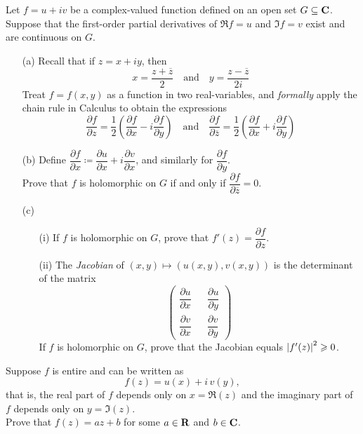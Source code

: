 \begin{problem}\label{prob 8.1}
Let $f = u + iv$ be a complex-valued function defined on an open set $G \subseteq \mathbf C$. Suppose that the first-order partial derivatives of $\Re f = u$ and $\Im f = v$ exist and are continuous on $G$.
\begin{itemize}[itemsep = 1em]
\item[(a)] Recall that if $z = x + iy$, then
\[x = \frac{z + \overline{z}}{2} \quad \text{and} \quad y = \frac{z - \overline{z}}{2i}\]
Treat $f = f(x,y)$ as a function in two real-variables, and \emph{formally} apply the chain rule in Calculus to obtain the expressions
\[\frac{\partial f}{\partial z} = \frac{1}{2}\left(\frac{\partial f}{\partial x} - i\frac{\partial f}{\partial y}\right) \quad \text{and} \quad \frac{\partial f}{\partial \overline{z}} = \frac{1}{2}\left(\frac{\partial f}{\partial x} + i\frac{\partial f}{\partial y}\right)\]
\item[(b)] Define $\dfrac{\partial f}{\partial x} \coloneqq \dfrac{\partial u}{\partial x} + i\dfrac{\partial v}{\partial x}$, and similarly for $\dfrac{\partial f}{\partial y}$.\\[1em] Prove that $f$ is holomorphic on $G$ if and only if $\dfrac{\partial f}{\partial \overline{z}} = 0$.
\item[(c)] 
\begin{itemize}[itemsep=1em]
\item[(i)] If $f$ is holomorphic on $G$, prove that $f'(z) = \dfrac{\partial f}{\partial z}$.
\item[(ii)] The \emph{Jacobian} of $(x,y) \mapsto (u(x,y),v(x,y))$ is the determinant of the matrix
\[\begin{pmatrix}
\dfrac{\partial u}{\partial x} && \dfrac{\partial u}{\partial y}\\[1.5em]
\dfrac{\partial v}{\partial x} && \dfrac{\partial v}{\partial y}
\end{pmatrix}\]
If $f$ is holomorphic on $G$, prove that the Jacobian equals $\left\lvert f'(z)\right\rvert^2 \geqslant 0$.
\end{itemize}
\end{itemize}
\end{problem}

\vspace{0.1in}

\begin{problem}\label{prob 8.2}
Suppose $f$ is entire and can be written as \[f(z) = u(x) + i\,v(y),\] that is, the
real part of $f$ depends only on $x = \Re(z)$ and the imaginary part of $f$ depends only on $y = \Im(z)$.\\[0.5em]
Prove that $f(z) = az + b$ for some $a \in \mathbf R$ and $b \in \mathbf C$.
\end{problem}

